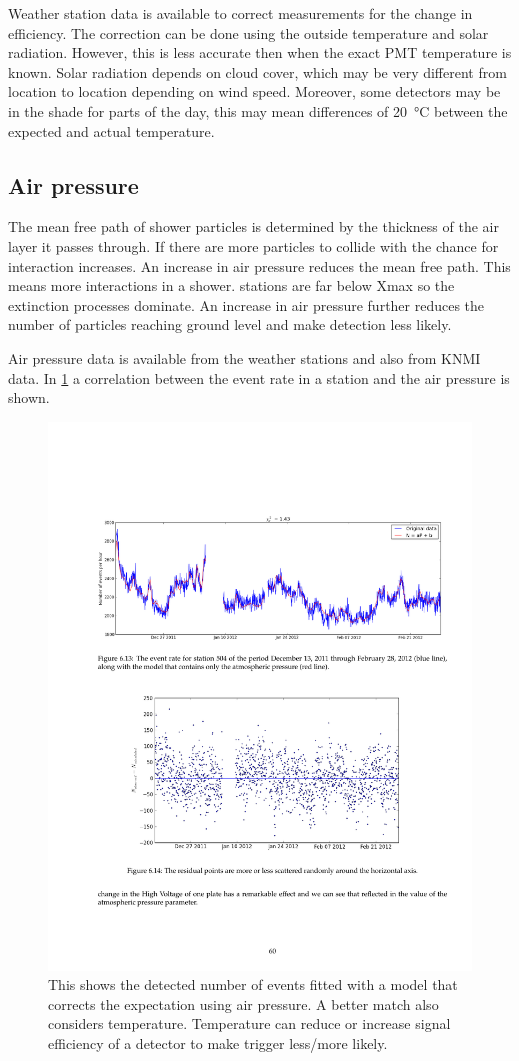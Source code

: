 Weather station data is available to correct measurements for the change in efficiency. The correction can be done using the outside temperature and solar radiation. However, this is less accurate then when the exact PMT temperature is known. Solar radiation depends on cloud cover, which may be very different from location to location depending on wind speed. Moreover, some detectors may be in the shade for parts of the day, this may mean differences of \SI{20}{\degreeCelsius} between the expected and actual temperature.


\subsection{Air pressure}

The mean free path of shower particles is determined by the thickness of the air layer it passes through. If there are more particles to collide with the chance for interaction increases. An increase in air pressure reduces the mean free path. This means more interactions in a shower. \hisparc stations are far below Xmax so the extinction processes dominate. An increase in air pressure further reduces the number of particles reaching ground level and make detection less likely.

Air pressure data is available from the \hisparc weather stations and also from KNMI data. In \cref{fig:rate_pressures} a correlation between the event rate in a station and the air pressure is shown.

\begin{figure}
    \centering
    \includegraphics[width=.7\linewidth]{plots/detector/barometer}
    \caption{This shows the detected number of events fitted with a model that corrects the expectation using air pressure. A better match also considers temperature. Temperature can reduce or increase signal efficiency of a detector to make trigger less/more likely.}
    \label{fig:rate_pressures}
\end{figure}

